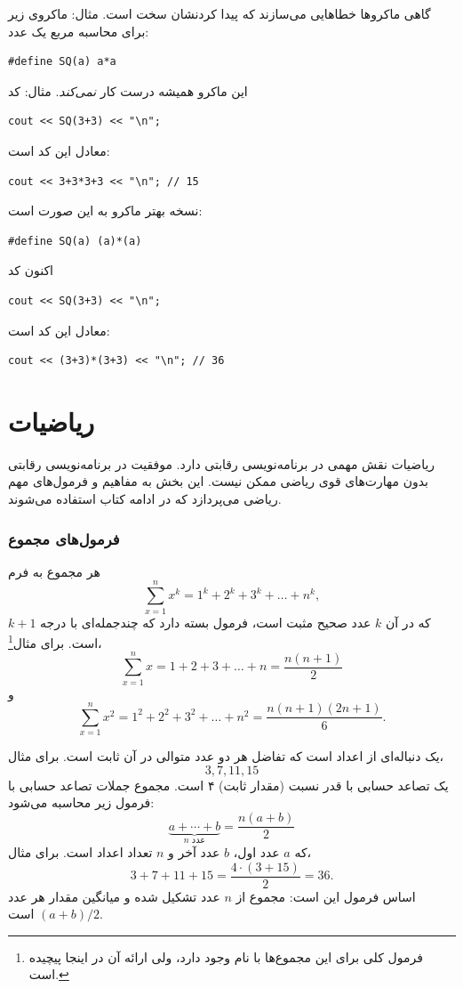 گاهی ماکروها خطاهایی می‌سازند که پیدا کردنشان سخت است.
مثال: ماکروی زیر برای محاسبه مربع یک عدد:
\begin{lstlisting}
#define SQ(a) a*a
\end{lstlisting}
این ماکرو همیشه درست کار \emph{نمی‌کند}.
مثال: کد
\begin{lstlisting}
cout << SQ(3+3) << "\n";
\end{lstlisting}
معادل این کد است:
\begin{lstlisting}
cout << 3+3*3+3 << "\n"; // 15
\end{lstlisting}

نسخه بهتر ماکرو به این صورت است:
\begin{lstlisting}
#define SQ(a) (a)*(a)
\end{lstlisting}
اکنون کد
\begin{lstlisting}
cout << SQ(3+3) << "\n";
\end{lstlisting}
معادل این کد است:
\begin{lstlisting}
cout << (3+3)*(3+3) << "\n"; // 36
\end{lstlisting}


\section{ریاضیات}

ریاضیات نقش مهمی در برنامه‌نویسی رقابتی دارد. موفقیت در برنامه‌نویسی رقابتی بدون مهارت‌های قوی ریاضی ممکن نیست. این بخش به مفاهیم و فرمول‌های مهم ریاضی می‌پردازد که در ادامه کتاب استفاده می‌شوند.

\subsubsection{فرمول‌های مجموع}

هر مجموع به فرم
\[\sum_{x=1}^n x^k = 1^k+2^k+3^k+\ldots+n^k,\]
که در آن $k$ عدد صحیح مثبت است، فرمول بسته دارد که چندجمله‌ای با درجه $k+1$ است.
برای مثال\footnote{
فرمول کلی برای این مجموع‌ها با نام  وجود دارد، ولی ارائه آن در اینجا پیچیده است.}،
\[\sum_{x=1}^n x = 1+2+3+\ldots+n = \frac{n(n+1)}{2}\]
و
\[\sum_{x=1}^n x^2 = 1^2+2^2+3^2+\ldots+n^2 = \frac{n(n+1)(2n+1)}{6}.\]

یک  
دنباله‌ای از اعداد است
که تفاضل هر دو عدد متوالی در آن ثابت است.
برای مثال،
\[3, 7, 11, 15\]
یک تصاعد حسابی با قدر نسبت (مقدار ثابت) ۴ است.
مجموع جملات تصاعد حسابی با فرمول زیر محاسبه می‌شود:
\[\underbrace{a + \cdots + b}_{n \,\, \textrm{عدد}} = \frac{n(a+b)}{2}\]
که $a$ عدد اول،
$b$ عدد آخر و
$n$ تعداد اعداد است.
برای مثال،
\[3+7+11+15=\frac{4 \cdot (3+15)}{2} = 36.\]
اساس فرمول این است: مجموع از $n$ عدد تشکیل شده و میانگین مقدار هر عدد $(a+b)/2$ است.

